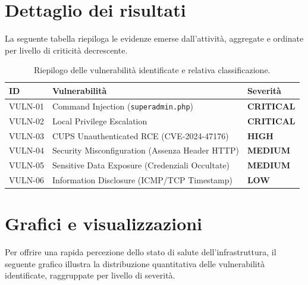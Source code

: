 \documentclass[11pt]{report}
\newcommand{\sevCRIT}{\textcolor{sevCritico}{\textbf{CRITICAL}}}
\newcommand{\sevHIGH}{\textcolor{sevElevato}{\textbf{HIGH}}}
\newcommand{\sevMED}{\textcolor{sevMedio}{\textbf{MEDIUM}}}
\newcommand{\sevLOW}{\textcolor{sevBasso}{\textbf{LOW}}}
\begin{document}
	\section{Dettaglio dei risultati}
	La seguente tabella riepiloga le evidenze emerse dall'attività, aggregate e ordinate per livello di criticità decrescente.
	
	\begin{table}[H]
		\centering
		\renewcommand{\arraystretch}{1.10}
		\begin{tabular}{>{\centering\arraybackslash}p{2cm} p{7.5cm} >{\centering\arraybackslash}p{3cm}}
			\toprule
			\textbf{ID} & \textbf{Vulnerabilità} & \textbf{Severità} \\
			\midrule
			VULN-01 & Command Injection (\texttt{superadmin.php}) & \sevCRIT \\
			VULN-02 & Local Privilege Escalation & \sevCRIT \\
			VULN-03 & CUPS Unauthenticated RCE (CVE-2024-47176) & \sevHIGH \\
			VULN-04 & Security Misconfiguration (Assenza Header HTTP) & \sevMED \\
			VULN-05 & Sensitive Data Exposure (Credenziali Occultate) & \sevMED \\
			VULN-06 & Information Disclosure (ICMP/TCP Timestamp) & \sevLOW \\
			\bottomrule
		\end{tabular}
		\caption{Riepilogo delle vulnerabilità identificate e relativa classificazione.}
	\end{table}
	
	\section{Grafici e visualizzazioni}
	Per offrire una rapida percezione dello stato di salute dell'infrastruttura, il seguente grafico illustra la distribuzione quantitativa delle vulnerabilità identificate, raggruppate per livello di severità.
	
\end{document}
